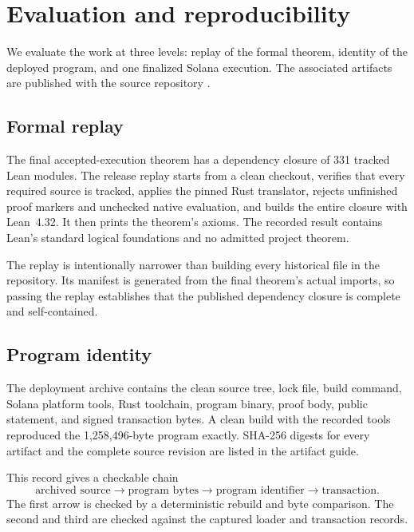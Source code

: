 \section{Evaluation and reproducibility}
\label{sec:evaluation}

We evaluate the work at three levels: replay of the formal theorem, identity of
the deployed program, and one finalized Solana execution.  The associated
artifacts are published with the source repository
\cite{AspisRepository2026}.

\subsection{Formal replay}

The final accepted-execution theorem has a dependency closure of 331 tracked
Lean modules.  The release replay starts from a clean checkout, verifies that
every required source is tracked, applies the pinned Rust translator, rejects
unfinished proof markers and unchecked native evaluation, and builds the
entire closure with Lean~4.32.  It then prints the theorem's axioms.  The
recorded result contains Lean's standard logical foundations and no admitted
project theorem.

The replay is intentionally narrower than building every historical file in
the repository.  Its manifest is generated from the final theorem's actual
imports, so passing the replay establishes that the published dependency
closure is complete and self-contained.

\subsection{Program identity}

The deployment archive contains the clean source tree, lock file, build
command, Solana platform tools, Rust toolchain, program binary, proof body,
public statement, and signed transaction bytes.  A clean build with the
recorded tools reproduced the 1,258,496-byte program exactly.  SHA-256 digests
for every artifact and the complete source revision are listed in the
artifact guide.

This record gives a checkable chain
\[
  \text{archived source}
  \longrightarrow \text{program bytes}
  \longrightarrow \text{program identifier}
  \longrightarrow \text{transaction}.
\]
The first arrow is checked by a deterministic rebuild and byte comparison.
The second and third are checked against the captured loader and transaction
records.

